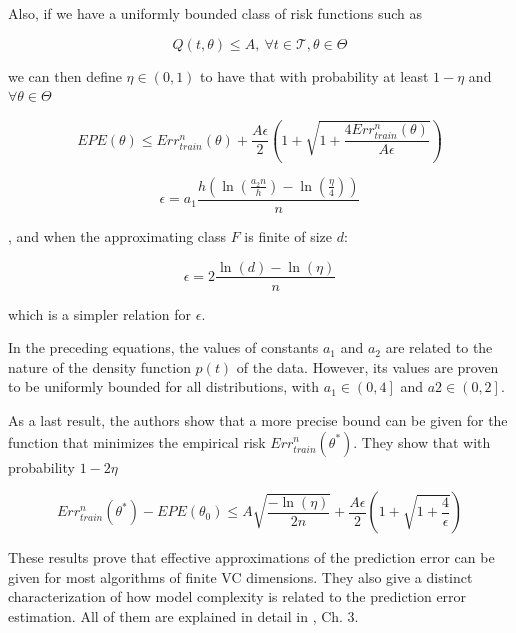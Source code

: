 \begin{appendices}
Also, if we have a uniformly bounded class of risk functions such as

\begin{equation}
Q(t,\theta) \leq A,  \ \forall t \in \mathcal {T}, \theta \in \Theta
\end{equation}

we can then define $\eta \in (0,1)$ to have that with probability at least $1 - \eta$ and $\forall \theta \in \Theta$

\begin{equation}
EPE(\theta) \leq Err^n_{train}(\theta) + \frac{A \epsilon}{2} \left(1 + \sqrt{1 + \frac{4 Err^n_{train}(\theta) }{A \epsilon}} \right)
\end{equation}\label{eq:vapnik-classificationBound}



\begin{equation}
\epsilon = a_1 \frac{h \left( \ln(\frac{a_2 n}{h} ) - \ln(\frac{\eta}{4} ) \right)}{n}
\end{equation}\label{eq:vapnik-epsilonBound}

, and when the approximating class $F$ is finite of size $d$:

\begin{equation}
\epsilon = 2 \frac{ \ln(d) - \ln(\eta)}{n}
\end{equation}\label{eq:vapnik-epsilonBoundSimple}


which is a simpler relation for $\epsilon$.

In the preceding equations, the values of constants $a_1$ and $a_2$ are related to the nature of the density function $p(t)$ of the data.
However, its values are proven to be uniformly bounded for all distributions, with $a_1 \in {\left(0,4 \right] }$ and $a2 \in {\left(0,2 \right]}$.

As a last result, the authors show that a more precise bound can be given for the function that minimizes the empirical risk $Err^n_{train}(\theta^*)$.
They show that with probability $1 - 2\eta$

\begin{equation}
Err^n_{train}(\theta^*) - EPE(\theta_0) \leq A \sqrt{\frac{-\ln(\eta)}{2n} } + \frac{A \epsilon}{2}\left( 1+ \sqrt{1 + \frac{4}{\epsilon} } \right)
\end{equation}\label{eq:vapnik-classificationBoundPrecise}

These results prove that effective approximations of the prediction error can be given for most algorithms of finite VC dimensions.
They also give a distinct characterization of how model complexity is related to the prediction error estimation.
All of them are explained in detail in \textcite{vapnik-nature2000}, Ch. 3.




\end{appendices}
